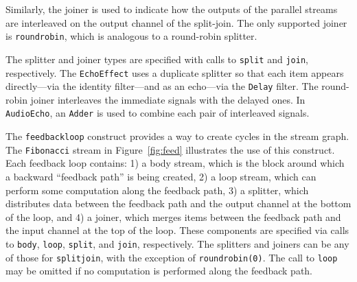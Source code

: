 
Similarly,  the joiner  is used  to indicate  how the  outputs  of the
parallel  streams  are  interleaved  on  the  output  channel  of  the
split-join.  The  only supported joiner  is \texttt{roundrobin}, which
is analogous to a round-robin splitter.

The   splitter  and  joiner   types  are   specified  with   calls  to
\texttt{split}      and     \texttt{join},      respectively.      The
\texttt{EchoEffect}  uses  a  duplicate  splitter so  that  each  item
appears directly---via the identity filter---and as an echo---via the
\texttt{Delay} filter. The round-robin joiner interleaves the
immediate signals  with the  delayed ones.  In  \texttt{AudioEcho}, an
\texttt{Adder} is used to combine each pair of interleaved signals.

The \texttt{feedbackloop} construct provides a way to create cycles in
the    stream    graph.      The    \texttt{Fibonacci}    stream    in
Figure~\ref{fig:feed}  illustrates the  use of  this  construct.  Each
feedback loop  contains: 1) a body  stream, which is  the block around
which  a backward  ``feedback  path''  is being  created,  2) a  loop
stream, which can perform some computation along the feedback path, 3)
a splitter, which  distributes data between the feedback  path and the
output  channel at  the bottom  of the  loop, and  4) a  joiner, which
merges items  between the feedback path  and the input  channel at the
top  of  the  loop.   These  components are  specified  via  calls  to
\texttt{body},   \texttt{loop},  \texttt{split},   and  \texttt{join},
respectively.
%
%
The splitters and joiners can  be any of those for \texttt{splitjoin},
with   the   exception  of   \texttt{roundrobin(0)}.    The  call   to
\texttt{loop} may be omitted if no computation is performed along the
feedback path.

